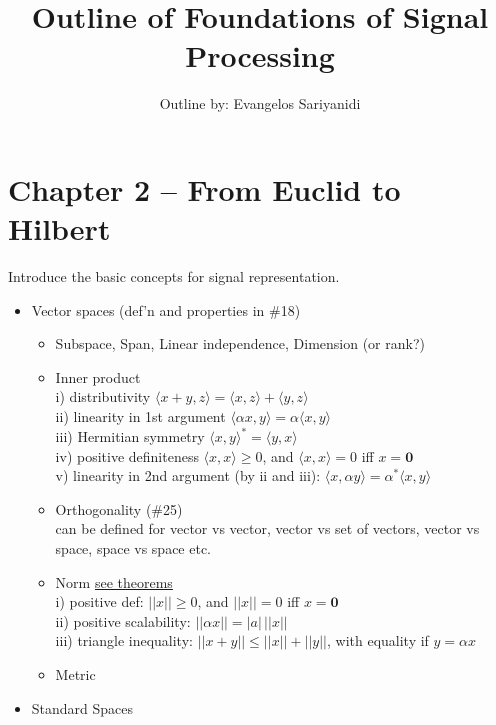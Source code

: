 \documentclass{article}
\newcommand{\la}{\langle}
\newcommand{\ra}{\rangle}
\begin{document}
\author{Outline by: Evangelos Sariyanidi}

\title{\bf Outline of Foundations of Signal Processing}
\maketitle
\section*{Chapter 2 -- From Euclid to Hilbert}
Introduce the basic concepts for signal representation. 
\begin{itemize}
\item Vector spaces (def'n and properties in \#18)
	\begin{itemize}
	\item Subspace, Span, Linear independence, Dimension (or rank?)
	\item Inner product \\
	{\color{gray}
	\footnotesize
	i) distributivity $\la x+y,z \ra=\la x,z \ra + \la y,z \ra$\\
	ii) linearity in 1st argument $\la \alpha x,y \ra = \alpha \la x,y \ra$\\
	iii) Hermitian symmetry $\la x, y \ra^{*}=\la y,x \ra$\\
	iv) positive definiteness $\la x,x \ra\ge 0$, and $\la x,x \ra=0$ iff $x=\mathbf{0}$\\
	v) linearity in 2nd argument (by ii and iii): $\la x, \alpha y \ra = \alpha^{*}\la x,y \ra$
	}
	\item Orthogonality (\#25) \\
	{\footnotesize\color{gray}
	can be defined for vector vs vector, vector vs set of vectors, vector vs space, space vs space etc.
	}
	\item Norm \hyperref[nomr_thms]{see theorems}\\
	{\footnotesize \color{gray}
	i) positive def: $||x||\ge 0$, and $||x||=0$ iff $x=\mathbf{0}$\\
	ii) positive scalability: $||\alpha x||=|a|\,||x||$\\
	iii) triangle inequality: $||x+y|| \le ||x||+||y||$, with equality if $y=\alpha x$
	}
	\item Metric
	\end{itemize}
\item Standard Spaces

\end{itemize}
\end{document}
